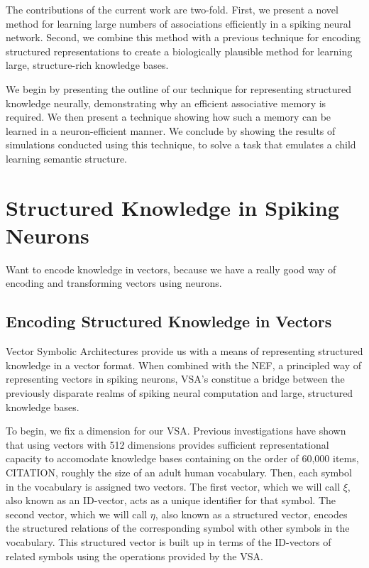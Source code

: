 \documentclass[10pt,letterpaper]{article}
\begin{document}
The contributions of the current work are two-fold. First, we present a novel method for learning large numbers of associations efficiently in a spiking neural network. Second, we combine this method with a previous technique for encoding structured representations to create a biologically plausible method for learning large, structure-rich knowledge bases.

We begin by presenting the outline of our technique for representing structured knowledge neurally, demonstrating why an efficient associative memory is required. We then present a technique showing how such a memory can be learned in a neuron-efficient manner. We conclude by showing the results of simulations conducted using this technique, to solve a task that emulates a child learning semantic structure.

\section{Structured Knowledge in Spiking Neurons}
Want to encode knowledge in vectors, because we have a really good way of encoding and transforming vectors using neurons.

\subsection{Encoding Structured Knowledge in Vectors}
Vector Symbolic Architectures provide us with a means of representing structured knowledge in a vector format. When combined with the NEF, a principled way of representing vectors in spiking neurons, VSA's constitue a bridge between the previously disparate realms of spiking neural computation and large, structured knowledge bases. 

To begin, we fix a dimension for our VSA. Previous investigations have shown that using vectors with 512 dimensions provides sufficient representational capacity to accomodate knowledge bases containing on the order of 60,000 items,  CITATION, roughly the size of an adult human vocabulary. Then, each symbol in the vocabulary is assigned two vectors. The first vector, which we will call $\xi$, also known as an ID-vector, acts as a unique identifier for that symbol. The second vector, which we will call $\eta$, also known as a structured vector, encodes the structured relations of the corresponding symbol with other symbols in the vocabulary. This structured vector is built up in terms of the ID-vectors of related symbols using the operations provided by the VSA. 
\end{document}
